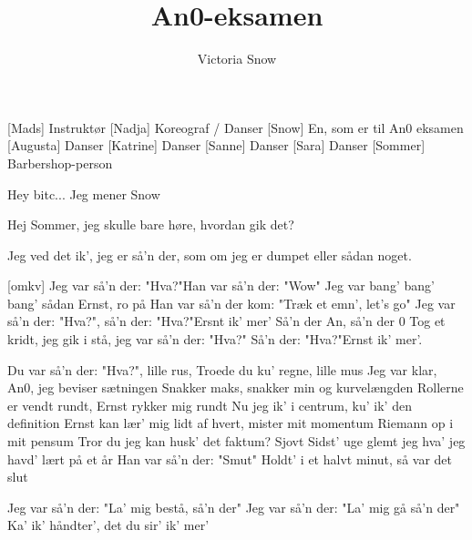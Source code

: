 \documentclass[a4paper,11pt]{article}
\title{An0-eksamen}
\author{Victoria Snow}
\begin{document}
\maketitle

\begin{roles}
[Mads] Instruktør
[Nadja] Koreograf / Danser
[Snow] En, som er til An0 eksamen
[Augusta] Danser
[Katrine] Danser
[Sanne] Danser
[Sara] Danser
[Sommer] Barbershop-person
\end{roles}

\begin{song}

 Hey bitc... Jeg mener Snow

 Hej Sommer, jeg skulle bare høre, hvordan gik det?

 Jeg ved det ik', jeg er så'n der, som om jeg er dumpet eller sådan noget.




[omkv]%
Jeg var så'n der: "Hva?"Han var så'n der: "Wow"
Jeg var bang' bang' bang' sådan Ernst, ro på
Han var så'n der kom: "Træk et emn', let's go"
Jeg var så'n der: "Hva?", så'n der: "Hva?"Ersnt ik' mer'
Så'n der An, så'n der 0
Tog et kridt, jeg gik i stå,
jeg var så'n der: "Hva?" Så'n der: "Hva?"Ernst ik' mer'.

%
Du var så'n der: "Hva?", lille rus,
Troede du ku' regne, lille mus
Jeg var klar, An0, jeg beviser sætningen
Snakker maks, snakker min og kurvelængden
Rollerne er vendt rundt, Ernst rykker mig rundt
Nu jeg ik' i centrum, ku' ik' den definition
Ernst kan lær' mig lidt af hvert, mister mit momentum
Riemann op i mit pensum
Tror du jeg kan husk' det faktum? Sjovt
Sidst' uge glemt jeg hva' jeg havd' lært på et år
Han var så'n der: "Smut"
Holdt' i et halvt minut, så var det slut

%
Jeg var så'n der: "La' mig bestå, så'n der"
Jeg var så'n der: "La' mig gå så'n der"
Ka' ik' håndter', det du sir' ik' mer'


\end{song}
\end{document}
